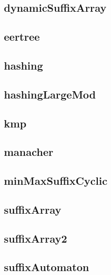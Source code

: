\subsection{dynamicSuffixArray}
\raggedbottom
\hrulefill
\subsection{eertree}
\raggedbottom
\hrulefill
\subsection{hashing}
\raggedbottom
\hrulefill
\subsection{hashingLargeMod}
\raggedbottom
\hrulefill
\subsection{kmp}
\raggedbottom
\hrulefill
\subsection{manacher}
\raggedbottom
\hrulefill
\subsection{minMaxSuffixCyclic}
\raggedbottom
\hrulefill
\subsection{suffixArray}
\raggedbottom
\hrulefill
\subsection{suffixArray2}
\raggedbottom
\hrulefill
\subsection{suffixAutomaton}
\raggedbottom
\hrulefill
